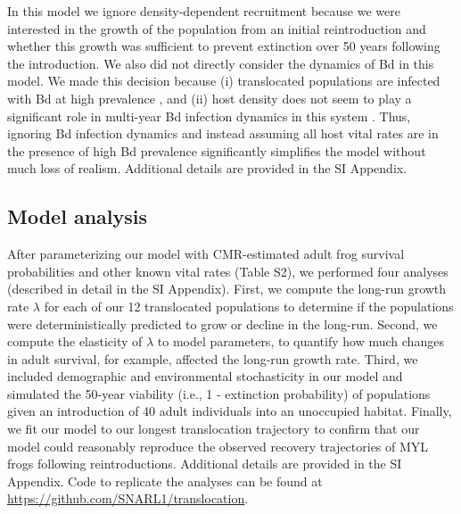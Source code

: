 \documentclass[9pt,twocolumn,twoside,lineno]{pnas-new}
\begin{document}
{In this model we ignore density-dependent recruitment because we were
interested in the growth of the population from an initial
reintroduction and whether this growth was sufficient to prevent
extinction over 50 years following the introduction. We also did not
directly consider the dynamics of Bd in this model. We made this
decision because (i) translocated populations are infected with Bd at
high prevalence \citep{joseph2018}, and (ii) host density does not seem
to play a significant role in multi-year Bd infection dynamics in this
system \citep{wilber2022}. Thus, ignoring Bd infection dynamics and
instead assuming all host vital rates are in the presence of high Bd
prevalence significantly simplifies the model without much loss of
realism. Additional details are provided in the SI Appendix.

\hypertarget{model-analysis}{%
\subsection*{Model analysis}\label{model-analysis}}

After parameterizing our model with CMR-estimated adult frog survival
probabilities and other known vital rates
(Table S2), we performed four analyses (described in
detail in the SI Appendix). First, we compute the long-run growth rate
\(\lambda\) for each of our 12 translocated populations to determine if
the populations were deterministically predicted to grow or decline in
the long-run. Second, we compute the elasticity of \(\lambda\) to model
parameters, to quantify how much changes in adult survival, for example,
affected the long-run growth rate. Third, we included demographic and
environmental stochasticity in our model and simulated the 50-year
viability (i.e., 1 - extinction probability) of populations given an
introduction of 40 adult individuals into an unoccupied habitat.
Finally, we fit our model to our longest translocation trajectory to
confirm that our model could reasonably reproduce the observed recovery
trajectories of MYL frogs following reintroductions. Additional details
are provided in the SI Appendix. Code to replicate the analyses can be
found at \url{https://github.com/SNARL1/translocation}.}


\showmatmethods{} %

\end{document}
